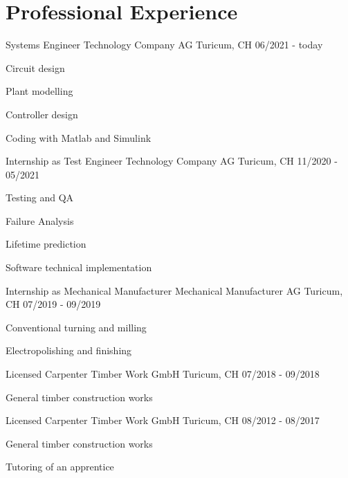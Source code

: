 \section{Professional Experience}
\cventry
{Systems Engineer} %
{Technology Company AG} %
{Turicum, CH} %
{06/2021 - today} %
\begin{cvitems}
\item {Circuit design}
\item {Plant modelling}
\item {Controller design}
\item {Coding with Matlab and Simulink}
\end{cvitems}

\cventry
{Internship as Test Engineer} %
{Technology Company AG} %
{Turicum, CH} %
{11/2020 - 05/2021} %
\begin{cvitems}
\item {Testing and QA}
\item {Failure Analysis}
\item {Lifetime prediction}
\item {Software technical implementation}
\end{cvitems}

\cventry
{Internship as Mechanical Manufacturer} %
{Mechanical Manufacturer AG} %
{Turicum, CH} %
{07/2019 - 09/2019} %
\begin{cvitems}
\item {Conventional turning and milling}
\item {Electropolishing and finishing}
\end{cvitems}

\cventry
{Licensed Carpenter} %
{Timber Work GmbH} %
{Turicum, CH} %
{07/2018 - 09/2018} %
\begin{cvitems}
\item {General timber construction works}
\end{cvitems}

\cventry
{Licensed Carpenter} %
{Timber Work GmbH} %
{Turicum, CH} %
{08/2012 - 08/2017} %
\begin{cvitems}
\item {General timber construction works}
\item {Tutoring of an apprentice}
\end{cvitems}